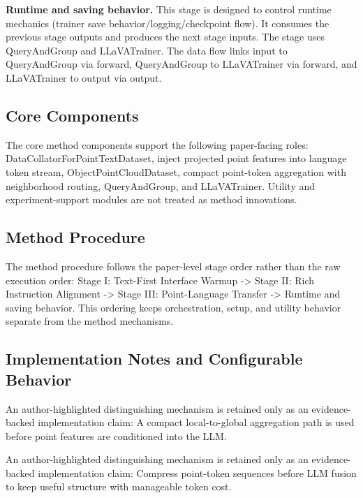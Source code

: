 \textbf{Runtime and saving behavior.} This stage is designed to control runtime mechanics (trainer save behavior/logging/checkpoint flow). It consumes the previous stage outputs and produces the next stage inputs. The stage uses QueryAndGroup and LLaVATrainer. The data flow links input to QueryAndGroup via forward, QueryAndGroup to LLaVATrainer via forward, and LLaVATrainer to output via output.

\subsection{Core Components}
The core method components support the following paper-facing roles: DataCollatorForPointTextDataset, inject projected point features into language token stream, ObjectPointCloudDataset, compact point-token aggregation with neighborhood routing, QueryAndGroup, and LLaVATrainer. Utility and experiment-support modules are not treated as method innovations.

\subsection{Method Procedure}
The method procedure follows the paper-level stage order rather than the raw execution order: Stage I: Text-First Interface Warmup -> Stage II: Rich Instruction Alignment -> Stage III: Point-Language Transfer -> Runtime and saving behavior. This ordering keeps orchestration, setup, and utility behavior separate from the method mechanisms.

\subsection{Implementation Notes and Configurable Behavior}
An author-highlighted distinguishing mechanism is retained only as an evidence-backed implementation claim: A compact local-to-global aggregation path is used before point features are conditioned into the LLM.

An author-highlighted distinguishing mechanism is retained only as an evidence-backed implementation claim: Compress point-token sequences before LLM fusion to keep useful structure with manageable token cost.
